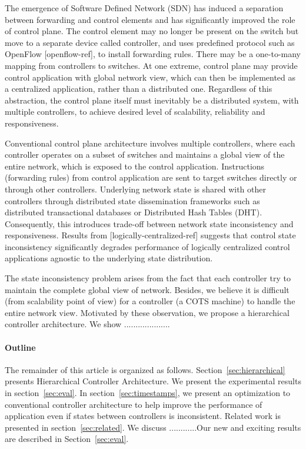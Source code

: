 \documentclass[10pt, twocolumn]{article}
\begin{document}
The emergence of Software Defined Network (SDN) has induced a separation between forwarding and control elements and has significantly improved the role of control plane. The control element may no longer be present on the switch but move to a separate device called controller, and uses predefined protocol such as OpenFlow [openflow-ref], to install forwarding rules. There may be a one-to-many mapping from controllers to switches. At one extreme, control plane may provide control application with global network view, which can then be implemented as a centralized application, rather than a distributed one. Regardless of this abstraction, the control plane itself must inevitably be a distributed system, with multiple controllers, to achieve desired level of scalability, reliability and responsiveness.                    

Conventional control plane architecture involves multiple controllers, where each controller operates on a subset of switches and maintains a global view of the entire network, which is exposed to the control application. Instructions (forwarding rules) from control application are sent to target switches directly or through other controllers. Underlying network state is shared with other controllers through distributed state dissemination frameworks such as distributed transactional databases or Distributed Hash Tables (DHT). Consequently, this introduces trade-off between network state inconsistency and responsiveness. Results from [logically-centralized-ref] suggests that control state inconsistency significantly degrades performance of logically centralized control applications agnostic to the underlying state distribution. 

The state inconsistency problem arises from the fact that each controller try to maintain the complete global view of network. Besides, we believe it is difficult (from scalability point of view) for a controller (a COTS machine) to handle the entire network view. Motivated by these observation, we propose a hierarchical controller architecture. We show ....................   
 

\paragraph{Outline}
The remainder of this article is organized as follows. Section~\ref{sec:hierarchical} presents Hierarchical Controller Architecture. We present the experimental results in section~\ref{sec:eval}. In section~\ref{sec:timestamps}, we present an optimization to conventional controller architecture to help improve the performance of application even if states between controllers is inconsistent. Related work is presented in section~\ref{sec:related}. We discuss ............Our new and exciting results are described in Section~\ref{sec:eval}.
\end{document}
